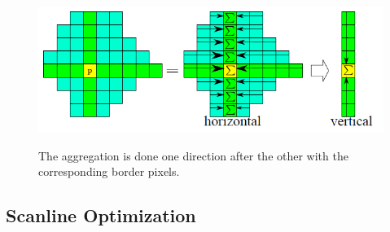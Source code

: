 \documentclass{article}
\begin{document}
\begin{figure}[h]
\begin{center}	
\includegraphics[scale=0.7]{Images/cost_aggregation.png}
	\label{cost_aggregation}
	\caption{ The aggregation is done one direction after the other with the corresponding border pixels.}
\end{center}
\end{figure}

\subsection{Scanline Optimization}
\end{document}
